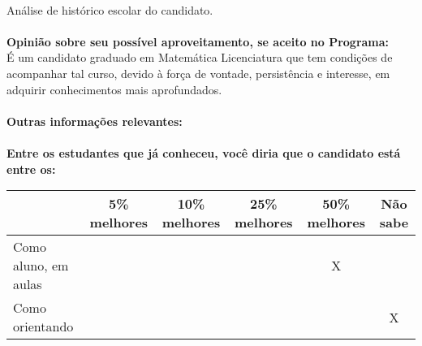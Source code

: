 \documentclass[11pt]{article}
\begin{document}
\\Análise de histórico escolar do candidato.\\
\\
\textbf{Opinião sobre seu possível aproveitamento, se aceito no Programa:}
\\É um candidato graduado em Matemática Licenciatura que tem condições de acompanhar tal curso, devido à força de vontade, persistência e interesse, em adquirir conhecimentos mais aprofundados.\\ 
\\
\textbf{Outras informações relevantes:} \\
\\[0.3cm]
\textbf{Entre os estudantes que já conheceu, você diria que o candidato está entre os:}
\\
\begin{tabular}{|l|c|c|c|c|c|}
\hline
 & 5\% melhores & 10\% melhores & 25\% melhores & 50\% melhores & Não sabe \\
\hline
Como aluno, em aulas &  &  &  & X & \\
\hline
Como orientando &  &  &  &  & X\\
\hline
\end{tabular}
\end{document}
